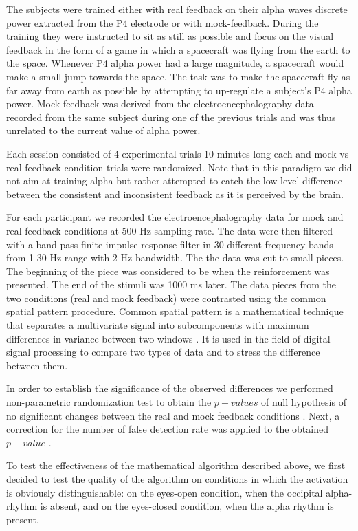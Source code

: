 \documentclass[14pt,a4paper]{scrartcl}
\begin{document}
The subjects were trained either with real feedback on their alpha waves discrete power extracted from the P4 electrode or with mock-feedback. During the training they were instructed to sit as still as possible and focus on the visual feedback in the form of a game in which a spacecraft was flying from the earth to the space. Whenever P4 alpha power had a large magnitude, a spacecraft would make a small jump towards the space. The task was to make the spacecraft fly as far away from earth as possible by attempting to up-regulate a subject’s P4 alpha power. Mock feedback was derived from the electroencephalography data recorded from the same subject during one of the previous trials and was thus unrelated to the current value of alpha power.

Each session consisted of 4 experimental trials 10 minutes long each and mock vs real feedback condition trials were randomized.  Note that in this paradigm we did not aim at training alpha but rather attempted to catch the low-level difference between the consistent and inconsistent feedback as it is perceived by the brain.

For each participant we recorded the electroencephalography data for mock and real feedback conditions at 500 Hz sampling rate. The data were then filtered with a band-pass finite impulse response filter in 30 different frequency bands from 1-30 Hz range with 2 Hz bandwidth. The the data was cut to small pieces. The beginning of the piece was considered to be when the reinforcement was presented. The end of the stimuli was 1000 ms later. The data pieces from the two conditions (real and mock feedback) were contrasted using the common spatial pattern procedure. Common spatial pattern is a mathematical technique that separates a multivariate signal into subcomponents with maximum differences in variance between two windows \cite{Koles1990}. It is used in the field of digital signal processing to compare two types of data and to stress the difference between them.

In order to establish the significance of the observed differences we performed non-parametric randomization test to obtain the $p-values$ of null hypothesis of no significant changes between the real and mock feedback conditions \cite{Maris2007}. Next, a correction for the number of false detection rate was applied to the obtained $p-value$ \cite{Benjamini2001}.

To test the effectiveness of the mathematical algorithm described above, we first decided to test the quality of the algorithm on conditions in which the activation is obviously distinguishable: on the eyes-open condition, when the occipital alpha-rhythm is absent, and on the eyes-closed condition, when the alpha rhythm is present.
\end{document}
